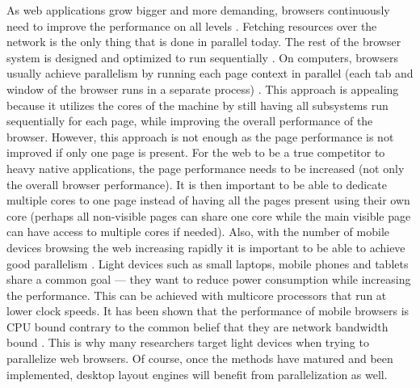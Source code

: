 \documentclass[a4paper,11pt]{kth-mag}
\begin{document}
        As \gls{web} applications grow bigger and more demanding, \glspl{browser} continuously need to improve the performance on all levels \cite{parallelizing_the_web_browser}.
        Fetching resources over the network is the only thing that is done in parallel today.
        The rest of the \gls{browser} system is designed and optimized to run sequentially \cite{zoomm}.
        On computers, \glspl{browser} usually achieve parallelism by running each page context in parallel (each tab and window of the \gls{browser} runs in a separate process) \cite{fan2011optimizing,zoomm}.
        This approach is appealing because it utilizes the cores of the machine by still having all subsystems run sequentially for each page, while improving the overall performance of the \gls{browser}.
        However, this approach is not enough as the page performance is not improved if only one page is present.
        For the \gls{web} to be a true competitor to heavy native applications, the page performance needs to be increased (not only the overall \gls{browser} performance).
        It is then important to be able to dedicate multiple cores to one page instead of having all the pages present using their own core (perhaps all non-visible pages can share one core while the main visible page can have access to multiple cores if needed).
        Also, with the number of mobile devices browsing the \gls{web} increasing rapidly it is important to be able to achieve good parallelism \cite{meyerovich2010fast,parallelizing_the_web_browser}.
        Light devices such as small laptops, mobile phones and tablets share a common goal --- they want to reduce power consumption while increasing the performance.
        This can be achieved with multicore processors that run at lower clock speeds.
        It has been shown that the performance of mobile \glspl{browser} is \gls{CPU} bound contrary to the common belief that they are network bandwidth bound \cite{parallelizing_the_web_browser,meyerovich2010fast}.
        This is why many researchers target light devices when trying to parallelize \gls{web} \glspl{browser}.
        Of course, once the methods have matured and been implemented, desktop layout engines will benefit from parallelization as well.
\end{document}
